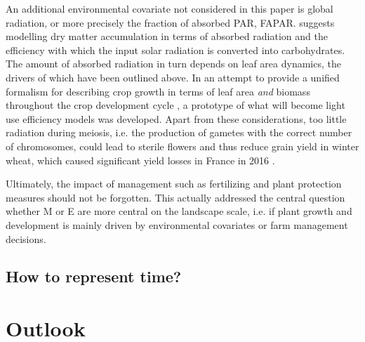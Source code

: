An additional environmental covariate not considered in this paper is global radiation, or more precisely the fraction of absorbed \gls{PAR}, FAPAR. \cite{monteith_climate_1977} suggests modelling dry matter accumulation in terms of absorbed radiation and the efficiency with which the input solar radiation is converted into carbohydrates. The amount of absorbed radiation in turn depends on leaf area dynamics, the drivers of which have been outlined above. In an attempt to provide a unified formalism for describing crop growth in terms of leaf area \textsl{and} biomass throughout the crop development cycle \cite{goudriaan_mathematical_1990}, a prototype of what will become light use efficiency models \citep{gitelson_productivity_2015} was developed. Apart from these considerations, too little radiation during meiosis, i.e. the production of gametes with the correct number of chromosomes, could lead to sterile flowers and thus reduce grain yield in winter wheat, which caused significant yield losses in France in 2016 \citep{le_gouis_how_2020}. %


Ultimately, the impact of management such as fertilizing and plant protection measures should not be forgotten. This actually addressed the central question whether M or E are more central on the landscape scale, i.e. if plant growth and development is mainly driven by environmental covariates or farm management decisions. %

\subsection{How to represent time?}


\section{Outlook}

